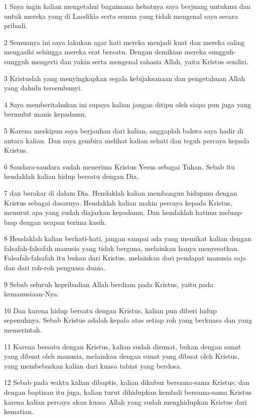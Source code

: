 \par 1 Saya ingin kalian mengetahui bagaimana hebatnya saya berjuang untukmu dan untuk mereka yang di Laodikia serta semua yang tidak mengenal saya secara pribadi.
\par 2 Semuanya ini saya lakukan agar hati mereka menjadi kuat dan mereka saling mengasihi sehingga mereka erat bersatu. Dengan demikian mereka sungguh-sungguh mengerti dan yakin serta mengenal rahasia Allah, yaitu Kristus sendiri.
\par 3 Kristuslah yang menyingkapkan segala kebijaksanaan dan pengetahuan Allah yang dahulu tersembunyi.
\par 4 Saya memberitahukan ini supaya kalian jangan ditipu oleh siapa pun juga yang bermulut manis kepadamu.
\par 5 Karena meskipun saya berjauhan dari kalian, anggaplah bahwa saya hadir di antara kalian. Dan saya gembira melihat kalian sehati dan teguh percaya kepada Kristus.
\par 6 Saudara-saudara sudah menerima Kristus Yesus sebagai Tuhan. Sebab itu hendaklah kalian hidup bersatu dengan Dia,
\par 7 dan berakar di dalam Dia. Hendaklah kalian membangun hidupmu dengan Kristus sebagai dasarnya. Hendaklah kalian makin percaya kepada Kristus, menurut apa yang sudah diajarkan kepadamu. Dan hendaklah hatimu meluap-luap dengan ucapan terima kasih.
\par 8 Hendaklah kalian berhati-hati, jangan sampai ada yang memikat kalian dengan falsafah-falsafah manusia yang tidak berguna, melainkan hanya menyesatkan. Falsafah-falsafah itu bukan dari Kristus, melainkan dari pendapat manusia saja dan dari roh-roh penguasa dunia.
\par 9 Sebab seluruh kepribadian Allah berdiam pada Kristus, yaitu pada kemanusiaan-Nya.
\par 10 Dan karena hidup bersatu dengan Kristus, kalian pun diberi hidup sepenuhnya. Sebab Kristus adalah kepala atas setiap roh yang berkuasa dan yang memerintah.
\par 11 Karena bersatu dengan Kristus, kalian sudah disunat, bukan dengan sunat yang dibuat oleh manusia, melainkan dengan sunat yang dibuat oleh Kristus, yang membebaskan kalian dari kuasa tabiat yang berdosa.
\par 12 Sebab pada waktu kalian dibaptis, kalian dikubur bersama-sama Kristus; dan dengan baptisan itu juga, kalian turut dihidupkan kembali bersama-sama Kristus karena kalian percaya akan kuasa Allah yang sudah menghidupkan Kristus dari kematian.
